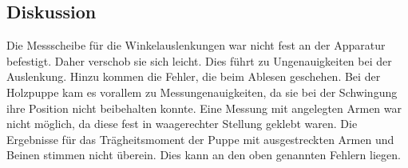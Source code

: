 \subsection{Diskussion}
Die Messscheibe für die Winkelauslenkungen war nicht fest an der Apparatur befestigt.
Daher verschob sie sich leicht. Dies führt zu Ungenauigkeiten bei der Auslenkung.
Hinzu kommen die Fehler, die beim Ablesen geschehen.
Bei der Holzpuppe kam es vorallem zu Messungenauigkeiten,
da sie bei der Schwingung ihre Position nicht beibehalten konnte.
 Eine Messung mit angelegten Armen war nicht möglich,
da diese fest in waagerechter Stellung geklebt waren.
Die Ergebnisse für das Trägheitsmoment der Puppe mit ausgestreckten Armen und Beinen
stimmen nicht überein. Dies kann an den oben genannten Fehlern liegen.
